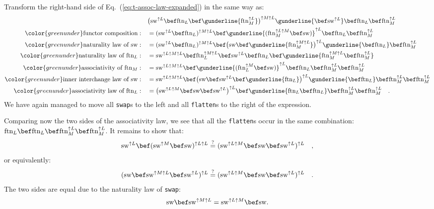 Transform the right-hand side of Eq.~(\ref{eq:t-assoc-law-expanded})
in the same way as:
\begin{align*}
 & \big(\text{sw}^{\uparrow L}\bef\text{ftn}_{L}\bef\gunderline{\text{ftn}_{M}^{\uparrow L}}\big)^{\uparrow M\uparrow L}\gunderline{\bef\text{sw}^{\uparrow L}}\bef\text{ftn}_{L}\bef\text{ftn}_{M}^{\uparrow L}\\
{\color{greenunder}\text{functor composition}:}\quad & =(\text{sw}^{\uparrow L}\bef\text{ftn}_{L})^{\uparrow M\uparrow L}\bef\gunderline{(\text{ftn}_{M}^{\uparrow L\uparrow M}\bef\text{sw})}^{\uparrow L}\bef\text{ftn}_{L}\bef\text{ftn}_{M}^{\uparrow L}\\
{\color{greenunder}\text{naturality law of }\text{sw}:}\quad & =(\text{sw}^{\uparrow L}\bef\text{ftn}_{L})^{\uparrow M\uparrow L}\bef\big(\text{sw}\bef\gunderline{\text{ftn}_{M}^{\uparrow M\uparrow L}}\big)^{\uparrow L}\gunderline{\bef\text{ftn}_{L}}\bef\text{ftn}_{M}^{\uparrow L}\\
{\color{greenunder}\text{naturality law of }\text{ftn}_{L}:}\quad & =\text{sw}^{\uparrow L\uparrow M\uparrow L}\bef\text{ftn}_{L}^{\uparrow M\uparrow L}\bef\text{sw}^{\uparrow L}\bef\text{ftn}_{L}\bef\gunderline{\text{ftn}_{M}^{\uparrow M\uparrow L}\bef\text{ftn}_{M}^{\uparrow L}}\\
{\color{greenunder}\text{associativity of }\text{ftn}_{M}:}\quad & =\text{sw}^{\uparrow L\uparrow M\uparrow L}\bef\gunderline{(\text{ftn}_{L}^{\uparrow M}\bef\text{sw})}^{\uparrow L}\bef\text{ftn}_{L}\bef\text{ftn}_{M}^{\uparrow L}\bef\text{ftn}_{M}^{\uparrow L}\\
{\color{greenunder}\text{inner interchange law of }\text{sw}:}\quad & =\text{sw}^{\uparrow L\uparrow M\uparrow L}\bef\big(\text{sw}\bef\text{sw}^{\uparrow L}\bef\gunderline{\text{ftn}_{L}}\big)^{\uparrow L}\gunderline{\bef\text{ftn}_{L}}\bef\text{ftn}_{M}^{\uparrow L}\bef\text{ftn}_{M}^{\uparrow L}\\
{\color{greenunder}\text{associativity law of }\text{ftn}_{L}:}\quad & =\big(\text{sw}^{\uparrow L\uparrow M}\bef\text{sw}\bef\text{sw}^{\uparrow L}\big)^{\uparrow L}\bef\gunderline{\text{ftn}_{L}\bef\text{ftn}_{L}}\bef\text{ftn}_{M}^{\uparrow L}\bef\text{ftn}_{M}^{\uparrow L}\quad.
\end{align*}
We have again managed to move all \lstinline!swap!s to the left and
all \lstinline!flatten!s to the right of the expression. 

Comparing now the two sides of the associativity law, we see that
all the \lstinline!flatten!s occur in the same combination: $\text{ftn}_{L}\bef\text{ftn}_{L}\bef\text{ftn}_{M}^{\uparrow L}\bef\text{ftn}_{M}^{\uparrow L}$.
It remains to show that:
\[
\text{sw}^{\uparrow L}\bef(\text{sw}^{\uparrow M}\bef\text{sw})^{\uparrow L\uparrow L}\overset{?}{=}(\text{sw}^{\uparrow L\uparrow M}\bef\text{sw}\bef\text{sw}^{\uparrow L})^{\uparrow L}\quad,
\]
or equivalently:
\[
(\text{sw}\bef\text{sw}^{\uparrow M\uparrow L}\bef\text{sw}^{\uparrow L})^{\uparrow L}\overset{?}{=}(\text{sw}^{\uparrow L\uparrow M}\bef\text{sw}\bef\text{sw}^{\uparrow L})^{\uparrow L}\quad.
\]
The two sides are equal due to the naturality law of \texttt{}\lstinline!swap!:
\[
\text{sw}\bef\text{sw}^{\uparrow M\uparrow L}=\text{sw}^{\uparrow L\uparrow M}\bef\text{sw}.
\]

